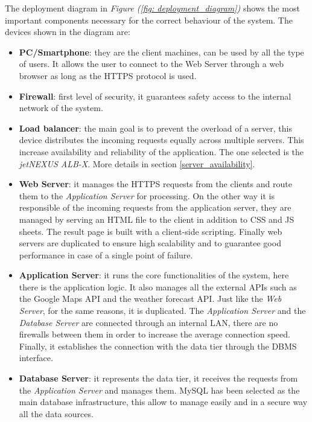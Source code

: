 \documentclass[table, 12pt]{article}
\begin{document}
The deployment diagram in \textit{Figure (\ref{fig: deployment_diagram})} shows the most important components necessary for the correct behaviour of the system.
The devices shown in the diagram are:
\begin{itemize}
    \item \textbf{PC/Smartphone}: they are the client machines, can be used by all the type of users.
    It allows the user to connect to the Web Server through a web browser as long as the HTTPS protocol is used.
    \item \textbf{Firewall}: first level of security, it guarantees safety access to the internal network of the system.
    \item \textbf{Load balancer}: the main goal is to prevent the overload of a server, this device distributes the incoming requests equally across multiple servers.
    This increase availability and reliability of the application.
    The one selected is the \textit{jetNEXUS ALB-X}. More details in section \ref{server_availability}.
    \item \textbf{Web Server}: it manages the HTTPS requests from the clients and route them to the \textit{Application Server} for processing.
    On the other way it is responsible of the incoming requests from the application server, they are managed by serving an HTML file to the client in addition to CSS and JS sheets.
    The result page is built with a client-side scripting.
    Finally web servers are duplicated to ensure high scalability and to guarantee good performance in case of a single point of failure.
    \item \textbf{Application Server}: it runs the core functionalities of the system, here there is the application logic.
    It also manages all the external APIs such as the Google Maps API and the weather forecast API.
    Just like the \textit{Web Server}, for the same reasons, it is duplicated.
    The \textit{Application Server} and the \textit{Database Server} are connected through an internal LAN, there are no firewalls between them in order to increase the average connection speed.
    Finally, it establishes the connection with the data tier through the DBMS interface.
    \item \textbf{Database Server}: it represents the data tier, it receives the requests from the \textit{Application Server} and manages them.
    MySQL has been selected as the main database infrastructure, this allow to manage easily and in a secure way all the data sources.
    
\end{itemize}
\newpage
\end{document}
